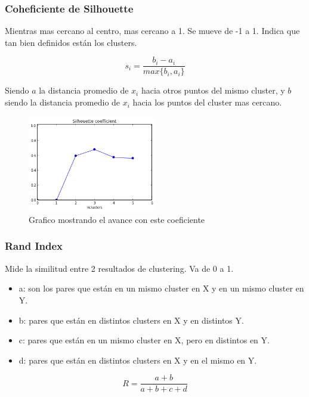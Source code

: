 \documentclass[titlepage,a4paper]{article}
\begin{document}
\subsubsection{Coheficiente de Silhouette}
Mientras mas cercano al centro, mas cercano a 1. Se mueve de -1 a 1. Indica que tan bien definidos están los clusters.

\begin{equation}
    s_i = \frac{b_i - a_i}{max\{b_i,a_i\}}
\end{equation}

Siendo $a$ la distancia promedio de $x_i$ hacia otros puntos del mismo cluster, y $b$ siendo la distancia promedio de $x_i$ hacia los puntos del cluster mas cercano.

\begin{figure}[!htb]
    \centering
    \includegraphics[width=0.5\textwidth]{imagenesResumen/SilhouetteCoef.png}
    \caption{Grafico mostrando el avance con este coeficiente}
\end{figure}

\newpage

\subsubsection{Rand Index}

Mide la similitud entre 2 resultados de clustering. Va de 0 a 1.

\begin{itemize}
    \item a: son los pares que están en un mismo cluster en X y en un mismo cluster en Y.
    \item b: pares que están en distintos clusters en X y en distintos Y.
    \item c: pares que están en un mismo cluster en X, pero en distintos en Y.
    \item d: pares que están en distintos clusters en X y en el mismo en Y.
\end{itemize}

\begin{equation}
    R = \frac{a+b}{a+b+c+d}
\end{equation}
\end{document}
